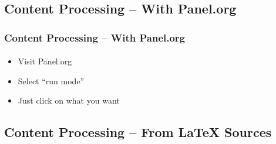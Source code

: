 \subsection{Content Processing -- With Panel.org}

\begin{comment}
*****  [[elisp:(org-cycle)][| ]]  [[elisp:(blee:ppmm:org-mode-toggle)][Nat]] [[elisp:(beginning-of-buffer)][Top]] [[elisp:(delete-other-windows)][(1)]] || /Frame/ *Label=ContentProcessing--WithPanel.org*  Content Processing -- With Panel.org ::  [[elisp:(org-cycle)][| ]]
\end{comment}

\begin{frame}[fragile,label=ContentProcessing--WithPanel.org]
    \frametitle{Content Processing -- With Panel.org}
    \framesubtitle{}

    \begin{itemize}
    \item Visit Panel.org
    \item Select ``run mode''
    \item Just click on what you want
    \end{itemize}

\end{frame}


\begin{comment}
**  [[elisp:(org-cycle)][| ]] [[elisp:(org-show-subtree)][|=]] [[elisp:(show-children 10)][|V]] [[elisp:(bx:orgm:indirectBufOther)][|>]] [[elisp:(bx:orgm:indirectBufMain)][|I]] [[elisp:(blee:ppmm:org-mode-toggle)][|N]] [[elisp:(org-top-overview)][|O]] [[elisp:(progn (org-shifttab) (org-content))][|C]] [[elisp:(delete-other-windows)][|1]]  /Subsection/   Content Processing -- From LaTeX Sources ::  [[elisp:(org-cycle)][| ]]
\end{comment}

\subsection{Content Processing -- From LaTeX Sources}

